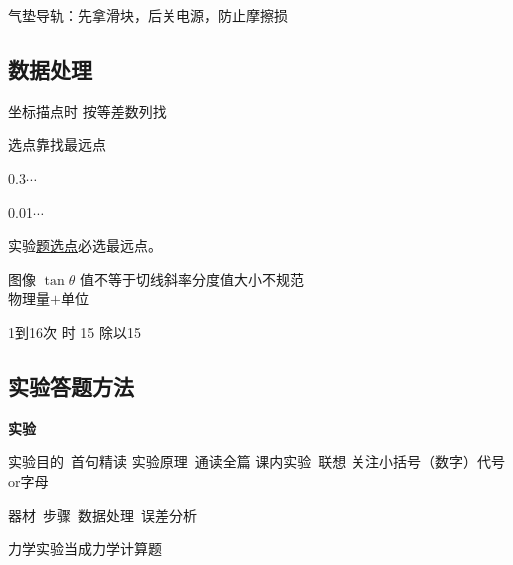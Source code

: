 气垫导轨：先拿滑块，后关电源，防止摩擦损 %

\subsection{数据处理}
坐标描点时 按等差数列找

选点靠找最远点

0.3\quad $\cdots$

0.01\quad $\cdots$

实验\underline{题选点}必选最远点。

图像 $\tan\theta$ 值不等于切线斜率\quad 分度值大小不规范 \\
物理量$+$单位

1到16次 时 15 除以15 %

\subsection{实验答题方法}
\textbf{实验}\par
实验目的\ 首句精读 \quad 实验原理\ 通读全篇 \quad {}课内实验\ 联想 \quad 关注小括号（数字）代号or字母\par
器材\ 步骤\ 数据处理\ 误差分析

力学实验当成力学计算题

